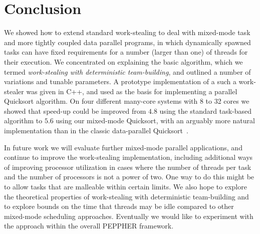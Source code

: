 \documentclass[preprint]{sigplanconf}
\begin{document}
\section{Conclusion}

We showed how to extend standard work-stealing to deal with mixed-mode
task and more tightly coupled data parallel programs, in which
dynamically spawned tasks can have fixed requirements for a number
(larger than one) of threads for their execution. We concentrated on
explaining the basic algorithm, which we termed \emph{work-stealing
with deterministic team-building}, and outlined a number of variations
and tunable parameters. A prototype implementation of a such a
work-stealer was given in C++, and used as the basis for implementing
a parallel Quicksort algorithm. On four different many-core systems
with 8 to 32 cores we showed that speed-up could be
improved from $4.8$ using the standard task-based algorithm to $5.6$
using our mixed-mode Quicksort, with an arguably more natural
implementation than in the classic data-parallel
Quicksort~\cite{TsigasZhang03}. 

In future work we will evaluate further mixed-mode parallel
applications, and continue to improve the work-stealing
implementation, including additional ways of improving processor
utilization in cases where the number of threads per task and the
number of processors is not a power of two. One way to do this might
be to allow tasks that are malleable within certain limits. We also
hope to explore the theoretical properties of work-stealing with
deterministic team-building and to explore bounds on the time that
threads may be idle compared to other mixed-mode scheduling
approaches. Eventually we would like to experiment with the approach within
the overall PEPPHER framework.
\end{document}
